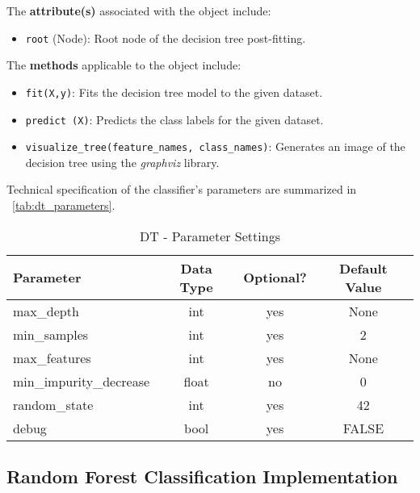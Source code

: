 \begin{appendices}
  The \textbf{attribute(s)} associated with the object include:
  \begin{itemize}
    \item \texttt{root} (Node): Root node of the decision tree post-fitting.
  \end{itemize}

  The \textbf{methods} applicable to the object include:
  \begin{itemize}
    \item \texttt{fit(X,y)}: Fits the decision tree model to the given dataset.
    \item \texttt{predict (X)}: Predicts the class labels for the given dataset.
    \item \texttt{visualize\_tree(feature\_names, class\_names)}: Generates an image of the decision tree using the \textit{graphviz} library.
  \end{itemize}

  Technical specification of the classifier's parameters are summarized in ~\autoref{tab:dt_parameters}.

  \begin{table}[H]
    \centering
    \begin{tabular}{lccc}
      \toprule
      \textbf{Parameter}      & \textbf{Data Type} & \textbf{Optional?} & \textbf{Default Value} \\
      \midrule
      max\_depth              & int                & yes                & None                   \\
      min\_samples            & int                & yes                & 2                      \\
      max\_features           & int                & yes                & None                   \\
      min\_impurity\_decrease & float              & no                 & 0                      \\
      random\_state           & int                & yes                & 42                     \\
      debug                   & bool               & yes                & FALSE                  \\
      \bottomrule
    \end{tabular}
    \caption{DT - Parameter Settings}
    \label{tab:dt_parameters}
  \end{table}


  \subsection{Random Forest Classification Implementation} \label{app:sec:rf_implementation}


\end{appendices}
